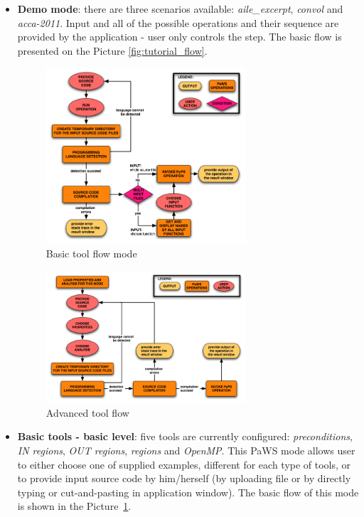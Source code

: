 \begin{itemize}

\item {\bf Demo mode}: there are three scenarios available:
  \emph{aile\_excerpt}, \emph{convol} and \emph{acca-2011}. Input and
  all of the possible operations and their sequence are provided by
  the application - user only controls the step. The basic flow is
  presented on the Picture \ref{fig:tutorial_flow}.
  
  \begin{figure}[h!]
  \centering
  \includegraphics[width=0.7\textwidth]{reportCh2/basic_tool_flow}
  \caption{Basic tool flow mode}
  \label{fig:basic_tool_flow}
\end{figure}

\begin{figure}[h!]
  \centering
  \includegraphics[width=0.7\textwidth]{reportCh2/advanced_tool_flow}
  \caption{Advanced tool flow}
  \label{fig:advanced_tool_flow}
\end{figure}
  
\item {\bf Basic tools - basic level}: five tools are currently
  configured: \emph{preconditions}, \emph{IN regions}, \emph{OUT
    regions}, \emph{regions} and \emph{OpenMP}. This PaWS mode allows
  user to either choose one of supplied examples, different for each
  type of tools, or to provide input source code by him/herself (by
  uploading file or by directly typing or cut-and-pasting in
  application window). The basic flow of this mode is shown in the
  Picture~\ref{fig:basic_tool_flow}.


\end{itemize}
